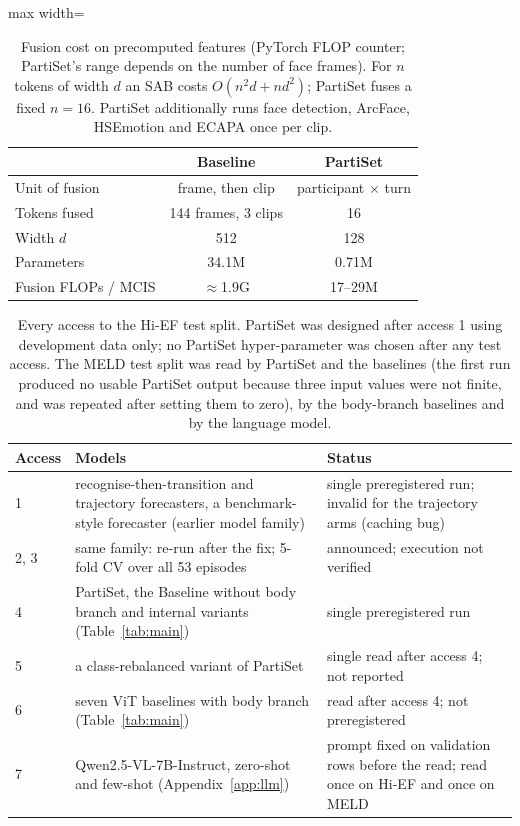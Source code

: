 \documentclass[11pt]{article}
\newcommand{\model}{PartiSet}
\begin{document}
\begin{table}[H]
\centering\small
\begin{adjustbox}{max width=\columnwidth}
\begin{tabular}{lcc}
\toprule
 & Baseline & \model{} \\
\midrule
Unit of fusion & frame, then clip & participant $\times$ turn \\
Tokens fused & 144 frames, 3 clips & 16 \\
Width $d$ & 512 & 128 \\
Parameters & 34.1M & 0.71M \\
Fusion FLOPs / MCIS & $\approx$1.9G & 17--29M \\
\bottomrule
\end{tabular}
\end{adjustbox}
\caption{Fusion cost on precomputed features (PyTorch FLOP counter; \model{}'s range depends on the number of face
frames). For $n$ tokens of width $d$ an SAB costs $O(n^2 d + n d^2)$; \model{} fuses a fixed $n = 16$. \model{}
additionally runs face detection, ArcFace, HSEmotion and ECAPA once per clip.}
\label{tab:complexity}
\end{table}

\begin{table}[H]
\centering\footnotesize
\begin{tabular}{@{}l>{\raggedright\arraybackslash}p{}>{\raggedright\arraybackslash}p{}@{}}
\toprule
Access & Models & Status \\
\midrule
1 & recognise-then-transition and trajectory forecasters, a benchmark-style forecaster (earlier model family) &
single preregistered run; invalid for the trajectory arms (caching bug) \\
2, 3 & same family: re-run after the fix; 5-fold CV over all 53 episodes & announced; execution not verified \\
4 & \model{}, the Baseline without body branch and internal variants (Table~\ref{tab:main}) & single preregistered run \\
5 & a class-rebalanced variant of \model{} & single read after access 4; not reported \\
6 & seven ViT baselines with body branch (Table~\ref{tab:main}) & read after access 4; not preregistered \\
7 & Qwen2.5-VL-7B-Instruct, zero-shot and few-shot (Appendix~\ref{app:llm}) & prompt fixed on validation rows before the read; read once on Hi-EF and once on MELD \\
\bottomrule
\end{tabular}
\caption{Every access to the Hi-EF test split. \model{} was designed after access 1 using development data only; no
\model{} hyper-parameter was chosen after any test access. The MELD test split was read by \model{} and the baselines
(the first run produced no usable \model{} output because three input values were not finite, and was repeated after
setting them to zero), by the body-branch baselines and by the language model.}
\label{tab:access}
\end{table}
\end{document}
